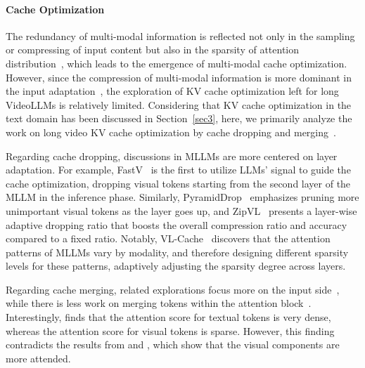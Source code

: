 \paragraph{Cache Optimization} The redundancy of multi-modal information is reflected not only in the sampling or compressing of input content but also in the sparsity of attention distribution~\citep{wan2024look,ma2023vista,tu2024vl}, which leads to the emergence of multi-modal cache optimization. However, since the compression of multi-modal information is more dominant in the input adaptation~\citep{song2024moviechat,ren2024timechat,qianmomentor,yu2024frame}, the exploration of KV cache optimization left for long VideoLLMs is relatively limited. Considering that KV cache optimization in the text domain has been discussed in Section~\ref{sec3}, here, we primarily analyze the work on long video KV cache optimization by cache dropping and merging~\citep{chen2025image,wan2024look}.

Regarding cache dropping, discussions in MLLMs are more centered on layer adaptation. For example, FastV~\citep{chen2025image} is the first to utilize LLMs' signal to guide the cache optimization, dropping visual tokens starting from the second layer of the MLLM in the inference phase. Similarly, PyramidDrop~\citep{xing2024pyramiddrop} emphasizes pruning more unimportant visual tokens as the layer goes up, and ZipVL~\citep{he2024zipvl} presents a layer-wise adaptive dropping ratio that boosts the overall compression ratio and accuracy compared to a fixed ratio. Notably, VL-Cache~\citep{tu2024vl} discovers that the attention patterns of MLLMs vary by modality, and therefore designing different sparsity levels for these patterns, adaptively adjusting the sparsity degree across layers. 

Regarding cache merging, related explorations focus more on the input side~\citep{li2025llama,shen2024longvu,lan2024vidcompress}, while there is less work on merging tokens within the attention block~\citep{wan2024look,liu2025efficient}. Interestingly, \citet{wan2024look} finds that the attention score for textual tokens is very dense, whereas the attention score for visual tokens is sparse. However, this finding contradicts the results from \citet{ma2023vista} and \citet{tu2024vl}, which show that the visual components are more attended.

